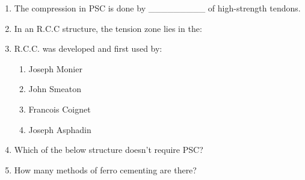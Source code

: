 \documentclass[11pt,a4paper]{article}
\begin{document}
\begin{enumerate}
\item{The compression in PSC is done by \_\_\_\_\_\_\_\_\_ of high-strength tendons.}
\\
\item{In an R.C.C structure, the tension zone lies in the:}
\\
\item{R.C.C. was developed and first used by:}
\begin{enumerate}[label=\Alph*.]
\item{Joseph Monier}
\item{John Smeaton}
\item{Francois Coignet}
\item{Joseph Asphadin}
\end{enumerate}
\item{Which of the below structure doesn't require PSC?}
\\
\item{How many methods of ferro cementing are there?}
\\

\end{enumerate}
\end{document}

